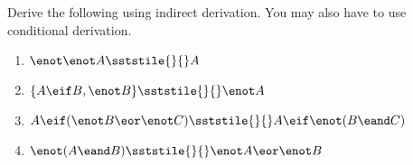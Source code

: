 \noindent\problempart Derive the following using indirect derivation. You may also have to use conditional derivation.
\begin{enumerate}[label=(\arabic*)]

\item $\enot \enot A  \sststile{}{}  A$
\label{DN2}


\item $\{A \eif B, \enot B\} \sststile{}{} \enot A$
\label{ModusTollens}


\item $A \eif (\enot B \eor \enot C) \sststile{}{} A \eif \enot (B \eand C)$
%

\item $\enot(A \eand B) \sststile{}{} \enot A \eor \enot B$


\end{enumerate}
